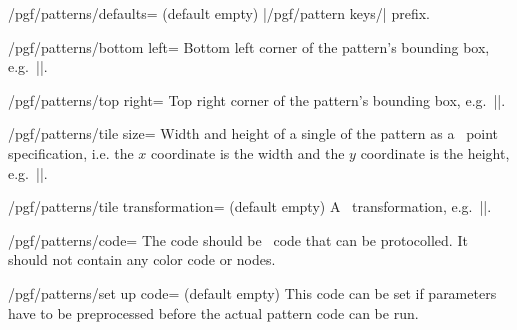 \begin{command}{\pgfdeclarepattern{}}
\begin{key}{/pgf/patterns/defaults= (default empty)}
        |/pgf/pattern keys/| prefix.
    \end{key}
    \begin{key}{/pgf/patterns/bottom left=}
        Bottom left corner of the pattern's bounding box, e.g.\
        |\pgfqpoint{-.1pt}{-.1pt}|.
    \end{key}
    \begin{key}{/pgf/patterns/top right=}
        Top right corner of the pattern's bounding box, e.g.\
        |\pgfqpoint{3.1pt}{3.1pt}|.
    \end{key}
    \begin{key}{/pgf/patterns/tile size=}
        Width and height of a single of the pattern as a \pgfname\ point
        specification, i.e. the $x$ coordinate is the width and the $y$
        coordinate is the height, e.g.\ |\pgfqpoint{3pt}{3pt}|.
    \end{key}
    \begin{key}{/pgf/patterns/tile transformation= (default empty)}
        A \pgfname\ transformation, e.g.\ ||.
    \end{key}
    \begin{key}{/pgf/patterns/code=}
        The code should be \pgfname\ code that can be protocolled. It should not
        contain any color code or nodes.
    \end{key}
    \begin{key}{/pgf/patterns/set up code= (default empty)}
        This code can be set if parameters have to be preprocessed before the
        actual pattern code can be run.
    \end{key}
\end{command}

